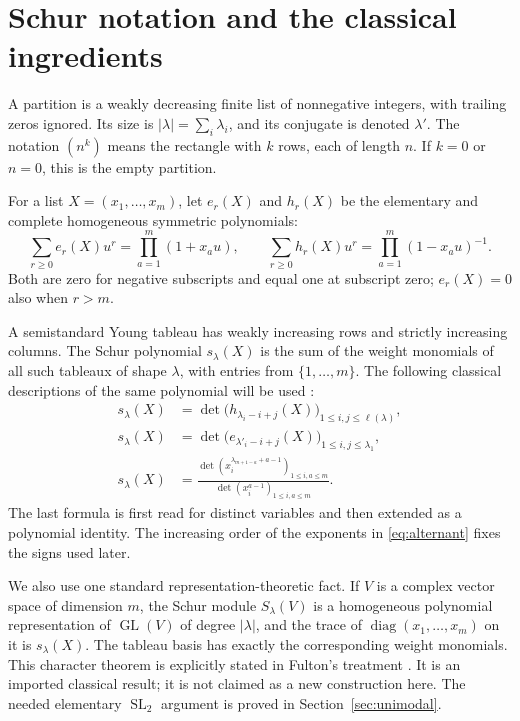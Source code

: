 \documentclass[11pt,a4paper]{article}
\theoremstyle{definition}
\theoremstyle{remark}
\newcommand{\SL}{\operatorname{SL}}
\newcommand{\GL}{\operatorname{GL}}
\newcommand{\diag}{\operatorname{diag}}
\newcommand{\len}{\ell}
\numberwithin{equation}{section}
\begin{document}
\section{Schur notation and the classical ingredients}
\label{sec:schur}
A partition is a weakly decreasing finite list of nonnegative integers,
with trailing zeros ignored. Its size is \(|\lambda|=\sum_i\lambda_i\),
and its conjugate is denoted \(\lambda'\). The notation \((n^k)\) means the
rectangle with \(k\) rows, each of length \(n\). If \(k=0\) or \(n=0\),
this is the empty partition.

For a list \(X=(x_1,\ldots,x_m)\), let \(e_r(X)\) and \(h_r(X)\) be the
elementary and complete homogeneous symmetric polynomials:
\begin{equation}
 \sum_{r\ge0}e_r(X)u^r=\prod_{a=1}^m(1+x_au),\qquad
 \sum_{r\ge0}h_r(X)u^r=\prod_{a=1}^m(1-x_au)^{-1}.
 \label{eq:eh}
\end{equation}
Both are zero for negative subscripts and equal one at subscript zero;
\(e_r(X)=0\) also when \(r>m\).

A semistandard Young tableau has weakly increasing rows and strictly
increasing columns. The Schur polynomial \(s_\lambda(X)\) is the sum of the
weight monomials of all such tableaux of shape \(\lambda\), with entries
from \(\{1,\ldots,m\}\). The following classical descriptions of the same
polynomial will be used \cite{fulton,macdonald}:
\begin{align}
 s_\lambda(X)
 &=\det\bigl(h_{\lambda_i-i+j}(X)\bigr)_{1\le i,j\le \len(\lambda)},
 \label{eq:jt}\\
 s_\lambda(X)
 &=\det\bigl(e_{\lambda'_i-i+j}(X)\bigr)_{1\le i,j\le\lambda_1},
 \label{eq:dual-jt}\\
 s_\lambda(X)
 &=\frac{\det(x_i^{\lambda_{m+1-a}+a-1})_{1\le i,a\le m}}
         {\det(x_i^{a-1})_{1\le i,a\le m}}.
 \label{eq:alternant}
\end{align}
The last formula is first read for distinct variables and then extended as
a polynomial identity. The increasing order of the exponents in
\eqref{eq:alternant} fixes the signs used later.

We also use one standard representation-theoretic fact. If \(V\) is a
complex vector space of dimension \(m\), the Schur module
\(S_\lambda(V)\) is a homogeneous polynomial representation of
\(\GL(V)\) of degree \(|\lambda|\), and the trace of
\(\diag(x_1,\ldots,x_m)\) on it is \(s_\lambda(X)\).
The tableau basis has exactly the corresponding weight monomials. This
character theorem is explicitly stated in Fulton's treatment
\cite{fulton}. It is an imported classical result; it is not claimed as a
new construction here. The needed elementary \(\SL_2\) argument is proved
in Section~\ref{sec:unimodal}.
\end{document}

